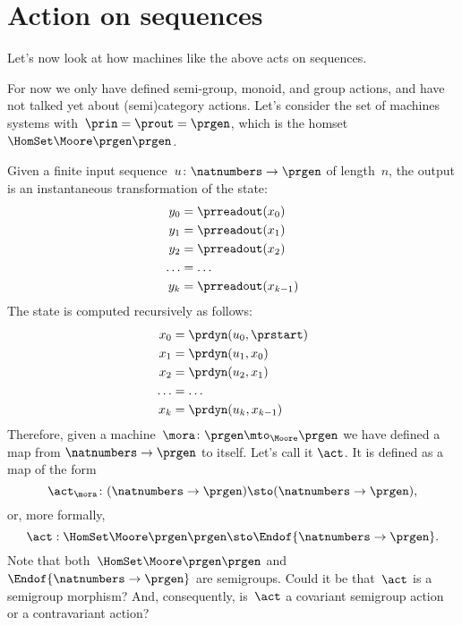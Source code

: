 \section{Action on sequences}

Let's now look at how machines like the above acts on sequences.

For now we only have defined semi-group, monoid, and group actions, and have not talked yet about (semi)category actions.
Let's consider the set of machines systems with~$\prin = \prout = \prgen$, which is the homset~$\HomSet\Moore\prgen\prgen$.

Given a finite input sequence~$u\colon \natnumbers \to \prgen$ of length~$n$, the output is an instantaneous transformation of the state:
%
\begin{equation}
    \label{eq:actions-on-sequences-y}
    \begin{aligned}
        y_0   & = \prreadout(x_0)     \\
        y_1   & = \prreadout(x_1)     \\
        y_2   & = \prreadout(x_2)     \\
        \dots & = \dots               \\
        y_{k} & = \prreadout(x_{k-1})
    \end{aligned}
\end{equation}
%
The state is computed recursively as follows:
\begin{equation}
    \label{eq:actions-on-sequences-x}
    \begin{aligned}
        x_0   & = \prdyn(u_0, \prstart)  \\
        x_1   & = \prdyn(u_1, x_0)       \\
        x_2   & = \prdyn(u_2, x_1)       \\
        \dots & = \dots                  \\
        x_{k} & = \prdyn(u_{k}, x_{k-1})
    \end{aligned}
\end{equation}
%
Therefore, given a machine~$\mora \colon \prgen \mto_{\Moore} \prgen$ we have defined a map from $\natnumbers \to \prgen$ to itself.
Let's call it $\act$.
It is defined as a map of the form
%
\begin{equation}
    \label{eq:actions-on-sequences-1}
    \act_{\mora}\colon  (\natnumbers \to \prgen)  \sto  (\natnumbers \to \prgen),
\end{equation}
%
or, more formally,
%
\begin{equation}
    \label{eq:actions-on-sequences-2}
    \act: \HomSet\Moore\prgen\prgen \sto \Endof {\natnumbers \to \prgen}.
\end{equation}
%
Note that both~$\HomSet\Moore\prgen\prgen$ and $\Endof {\natnumbers \to \prgen}$ are semigroups.
Could it be that~$\act$ is a semigroup morphism?
And, consequently, is~$\act$ a covariant semigroup action or a contravariant action?

